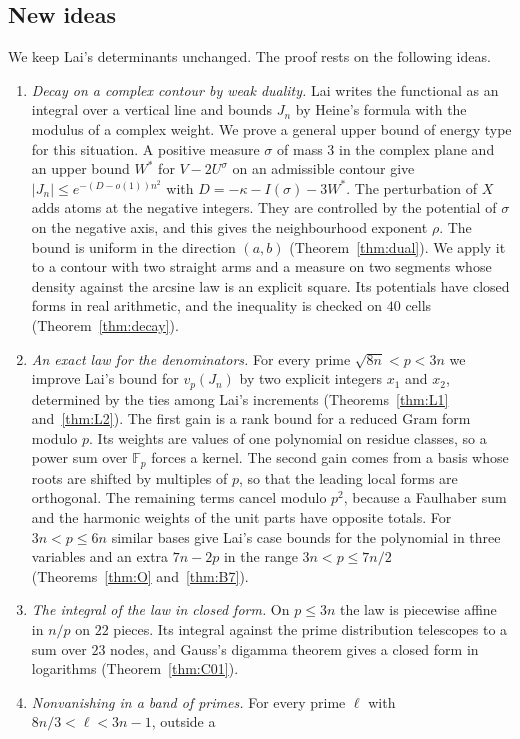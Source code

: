 \documentclass[11pt]{amsart}
\theoremstyle{definition}
\theoremstyle{remark}
\numberwithin{equation}{section}
\newcommand{\F}{\mathbb F}
\begin{document}
\subsection{New ideas}
We keep Lai's determinants unchanged. The proof rests on the following ideas.
\begin{enumerate}[leftmargin=*]
\item \emph{Decay on a complex contour by weak duality.} Lai writes the functional as an integral over a vertical
 line and bounds $J_n$ by Heine's formula with the modulus of a complex weight. We prove a general upper bound of
 energy type for this situation. A positive measure $\sigma$ of mass $3$ in the complex plane and an upper bound
 $W^*$ for $V-2U^\sigma$ on an admissible contour give $|J_n|\le e^{-(D-o(1))n^2}$ with $D=-\kappa-I(\sigma)-3W^*$.
 The perturbation of $X$ adds atoms at the negative integers. They are controlled by the potential of $\sigma$ on
 the negative axis, and this gives the neighbourhood exponent $\rho$. The bound is uniform in the direction $(a,b)$
 (Theorem~\ref{thm:dual}). We apply it to a contour with two straight arms and a measure on two segments whose
 density against the arcsine law is an explicit square. Its potentials have closed forms in real arithmetic, and the
 inequality is checked on $40$ cells (Theorem~\ref{thm:decay}).
\item \emph{An exact law for the denominators.} For every prime $\sqrt{8n}<p<3n$ we improve Lai's bound for
 $v_p(J_n)$ by two explicit integers $x_1$ and $x_2$, determined by the ties among Lai's increments
 (Theorems~\ref{thm:L1} and~\ref{thm:L2}). The first gain is a rank bound for a reduced Gram form modulo $p$. Its weights
 are values of one polynomial on residue classes, so a power sum over $\F_p$ forces a kernel. The second gain comes
 from a basis whose roots are shifted by multiples of $p$, so that the leading local forms are orthogonal. The
 remaining terms cancel modulo $p^2$, because a Faulhaber sum and the harmonic weights of the unit parts have
 opposite totals. For $3n<p\le6n$ similar bases give Lai's case bounds for the polynomial in three variables and an
 extra $7n-2p$ in the range $3n<p\le7n/2$ (Theorems~\ref{thm:O} and~\ref{thm:B7}).
\item \emph{The integral of the law in closed form.} On $p\le3n$ the law is piecewise affine in $n/p$ on $22$
 pieces. Its integral against the prime distribution telescopes to a sum over $23$ nodes, and Gauss's digamma
 theorem gives a closed form in logarithms (Theorem~\ref{thm:C01}).
\item \emph{Nonvanishing in a band of primes.} For every prime $\ell$ with $8n/3<\ell<3n-1$, outside a

\end{enumerate}
\end{document}
